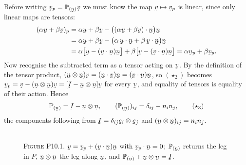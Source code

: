 \begin{solution}
Before writing $\bv_p=\Proj{\bn}\bv$ we must know the map $\bv\mapsto\bv_p$
is linear, since only linear maps are tensors:
\[
\begin{aligned}
   (\alpha\bu+\beta\bv)_p
   &=\alpha\bu+\beta\bv-\big(\ip{(\alpha\bu+\beta\bv)}{\bn}\big)\bn\\
   &=\alpha\bu+\beta\bv-\big(\alpha\,\ip\bu\bn+\beta\,\ip\bv\bn\big)\bn\\
   &=\alpha\big[\bu-(\ip\bu\bn)\bn\big]+\beta\big[\bv-(\ip\bv\bn)\bn\big]
   =\alpha\bu_p+\beta\bv_p .
\end{aligned}
\]
Now recognise the subtracted term as a tensor acting on $\bv$. By the
definition of the tensor product, $(\bn\otimes\bn)\bv=(\ip\bn\bv)\bn
=(\ip\bv\bn)\bn$, so $(\star_2)$ becomes
$\bv_p=\bv-(\bn\otimes\bn)\bv=[\I-\bn\otimes\bn]\bv$ for every $\bv$, and
equality of tensors is equality of their action. Hence
\begin{equation}
   \Proj{\bn}=\I-\bn\otimes\bn,\qquad
   (\Proj{\bn})_{ij}=\dd_{ij}-n_in_j , \tag{$\star_3$}
\end{equation}
the components following from $\I=\dd_{ij}\be_i\otimes\be_j$ and
$(\bn\otimes\bn)_{ij}=n_in_j$.


\begin{figure}[htbp]\centering
{}
\\[1.2ex]
{\footnotesize\textsc{Figure P10.1.} $\bv=\bv_p+(\ip\bv\bn)\bn$ with
$\ip{\bv_p}\bn=0$; $\Proj{\bn}$ returns the leg in $P$, $\bn\otimes\bn$ the
leg along $\bn$, and $\Proj{\bn}+\bn\otimes\bn=\I$.}
\end{figure}



\end{solution}
